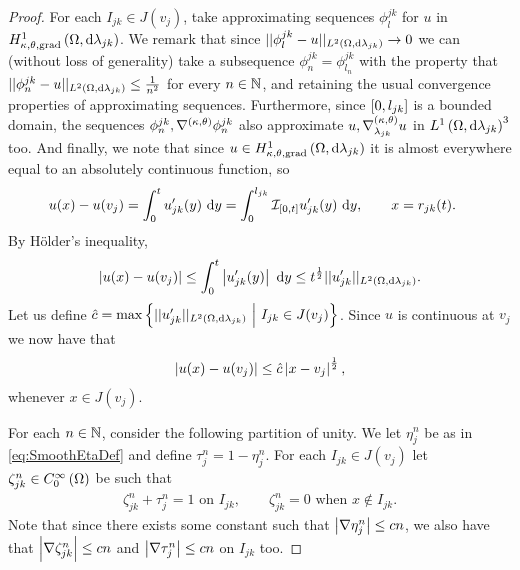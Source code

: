 \begin{proof}
	For each $I_{jk}\in J(v_j)$, take approximating sequences $\phi_l^{jk}$ for $u$ in $H^1_{\kappa,\theta,\mathrm{grad}}\left( \Omega, \mathrm{d}\lambda_{jk} \right)$.
	We remark that since $\lvert\lvert \phi_l^{jk}-u \rvert\rvert_{L^{2}\left( \Omega,\mathrm{d} \lambda_{jk} \right)}\rightarrow 0$ we can (without loss of generality) take a subsequence $\phi_n^{jk} = \phi_{l_n}^{jk}$ with the property that$\lvert\lvert \phi_n^{jk}-u \rvert\rvert_{L^{2}\left( \Omega,\mathrm{d} \lambda_{jk} \right)} \leq \frac{1}{n^2}$ for every $n\in\mathbb{N}$, and retaining the usual convergence properties of approximating sequences.
	Furthermore, since $\left[ 0,l_{jk} \right]$ is a bounded domain, the sequences $\phi_n^{jk}, \nabla^{\left( \kappa, \theta \right)}\phi_n^{jk}$ also approximate $u, \nabla^{\left( \kappa, \theta \right)}_{\lambda_{jk}}u$ in $L^1\left( \Omega,\mathrm{d}\lambda_{jk} \right)^3$ too.
	And finally, we note that since $u\in H^1_{\kappa,\theta,\mathrm{grad}}\left( \Omega, \mathrm{d}\lambda_{jk} \right)$ it is almost everywhere equal to an absolutely continuous function, so
	\begin{align*}
		u(x)-u(v_j) 
		&= \int_0^t u_{jk}'(y) \ \mathrm{d} y 
		= \int_0^{l_{jk}} \mathcal{I}_{\left[ 0,t \right]}u_{jk}'(y) \ \mathrm{d} y, 
		\qquad x=r_{jk}(t).
	\end{align*}
	By H\"{o}lder's inequality,
	\begin{align*}
		\left\lvert  u(x)-u(v_j)  \right\rvert 
		\leq \int_0^t \left\lvert u_{jk}'(y) \right\rvert \ \mathrm{d} y
		\leq t^{\frac{1}{2}} \lvert\lvert u_{jk}' \rvert\rvert_{L^{2}\left( \Omega,\mathrm{d} \lambda_{jk} \right)}.
	\end{align*}
	Let us define $\hat{c} = \max\left\{  \lvert\lvert u'_{jk} \rvert\rvert_{L^{2}\left( \Omega,\mathrm{d} \lambda_{jk} \right)} \ \middle\vert \  I_{jk} \in J(v_j) \right\}$.
	Since $u$ is continuous at $v_j$ we now have that
	\begin{align*}
		\left\lvert  u(x)-u(v_j)  \right\rvert \leq \hat{c}\left\lvert x-v_j \right\rvert^{\frac{1}{2}},
	\end{align*}
	whenever $x\in J(v_j)$.
	
	For each $n\in\mathbb{N}$, consider the following partition of unity.
	We let $\eta_j^n$ be as in \eqref{eq:SmoothEtaDef} and define $\tau_j^n = 1-\eta_j^n$.
	For each $I_{jk}\in J(v_j)$ let $\zeta_{jk}^n\in C^{\infty}_{0}\left( \Omega \right)$ be such that
	\begin{align*}
		\zeta_{jk}^n + \tau_j^n = 1 \text{ on } I_{jk}, 
		\qquad \zeta_{jk}^n = 0 \text{ when } x\not\in I_{jk}.
	\end{align*}
	Note that since there exists some constant such that $\left\lvert \nabla\eta_j^n \right\rvert\leq cn$, we also have that $\left\lvert \nabla\zeta_{jk}^n \right\rvert\leq cn$ and $\left\lvert \nabla\tau_j^n \right\rvert\leq cn$ on $I_{jk}$ too.
	

\end{proof}
